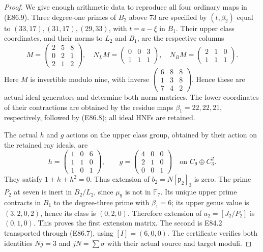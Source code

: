 \begin{proof}
We give enough arithmetic data to reproduce
all four ordinary maps in (E86.9).
Three degree-one primes of $B_2$ above $73$
are specified by $(t,\beta_2)$ equal to
$(33,17),(31,17),(29,33)$, with
$t=a-\xi$ in $B_1$. Their upper class
coordinates, and their norms to $L_2$
and $B_1$, are the respective columns
\[
 M=\begin{pmatrix}2&5&8\\0&2&1\\2&1&2\end{pmatrix},
 \quad N_LM=\begin{pmatrix}0&0&3\\1&1&1\end{pmatrix},
 \quad N_BM=\begin{pmatrix}2&1&0\\1&1&1\end{pmatrix}.
 \tag{E86.26}
\]
Here $M$ is invertible modulo nine, with
inverse
$\left(\begin{smallmatrix}6&8&8\\1&3&8\\7&4&2\end{smallmatrix}\right)$.
Hence these are actual ideal generators
and determine both norm matrices. The
lower coordinates of their contractions
are obtained by the residue maps
$\beta_1=22,22,21$, respectively, followed
by (E86.8); all ideal HNFs are retained.

The actual $h$ and $g$ actions on the upper
class group, obtained by their action on
the retained ray ideals, are
\[
 h=\begin{pmatrix}1&0&6\\1&1&0\\1&0&1\end{pmatrix},
 \qquad g=\begin{pmatrix}4&0&0\\2&1&0\\0&0&1\end{pmatrix}
       \quad\text{on }C_9\oplus C_3^2.
 \tag{E86.27}
\]
They satisfy $1+h+h^2=0$. Thus extension
of $b_2=N[\mathfrak p_2]_3$ is zero.
The prime $P_2$ at seven is inert in
$B_2/L_2$, since $\mu_9$ is not in
$\mathbb F_7$. Its unique upper prime
contracts in $B_1$ to the degree-three
prime with $\beta_1=6$; its upper genus
value is $(3,2,0,2)$, hence its class
is $(0,2,0)$. Therefore extension of
$a_2=[J_2/P_2]$ is $(0,1,0)$.
This proves the first extension matrix.
The second is E84.2 transported through
(E86.7), using $[I]=(6,0,0)$.
The certificate verifies both identities
$Nj=3$ and $jN=\sum\sigma$ with their
actual source and target moduli.


\end{proof}
